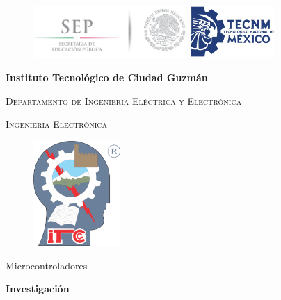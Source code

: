 \documentclass[12pt,a4paper]{article}
\begin{document}
\begin{titlepage}

    \begin{figure}[h]
 	\centering
    	{\includegraphics[height=2cm]{SEP_logo}}
    	\hspace{6cm}
    	{\includegraphics[height=2cm]{TecNM}}
    \end{figure}
    
    \centering
    \vspace{1cm}
    {\Large\bfseries Instituto Tecnológico de Ciudad Guzmán\par \vspace{.5cm}}
    {\Large \scshape Departamento de Ingeniería Eléctrica y Electrónica \par \vspace{.5cm}}
    {\Large \scshape Ingeniería Electrónica \par \vspace{.5cm}}
    \begin{figure}[h]
    \centering
     \includegraphics[height=4cm]{logo}
    \end{figure}
    \par \vspace{.2cm}
   
	{\huge Microcontroladores\par\vspace{.5cm}}
	{\Large\bfseries Investigación\\ \par\vspace{3cm}}
	
\end{titlepage} 
\end{document}
